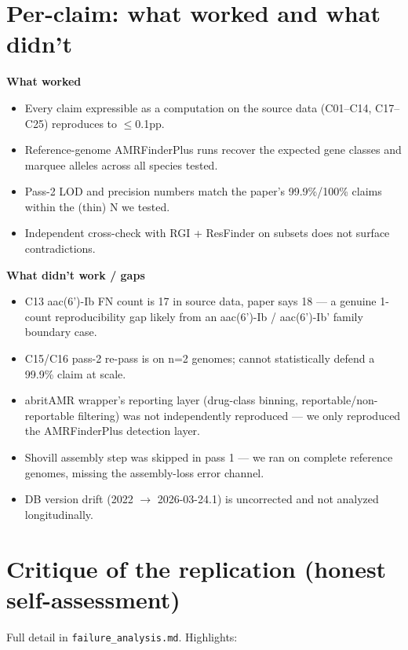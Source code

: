 \documentclass[11pt,a4paper]{article}
\begin{document}
\section{Per-claim: what worked and what didn't}

\textbf{What worked}
\begin{itemize}[leftmargin=1.5em]
  \item Every claim expressible as a computation on the source data (C01--C14, C17--C25) reproduces to $\leq$0.1pp.
  \item Reference-genome AMRFinderPlus runs recover the expected gene classes and marquee alleles across all species tested.
  \item Pass-2 LOD and precision numbers match the paper's 99.9\%/100\% claims within the (thin) N we tested.
  \item Independent cross-check with RGI + ResFinder on subsets does not surface contradictions.
\end{itemize}

\textbf{What didn't work / gaps}
\begin{itemize}[leftmargin=1.5em]
  \item C13 aac(6')-Ib FN count is 17 in source data, paper says 18 --- a genuine 1-count reproducibility gap likely from an aac(6')-Ib / aac(6')-Ib' family boundary case.
  \item C15/C16 pass-2 re-pass is on n=2 genomes; cannot statistically defend a 99.9\% claim at scale.
  \item abritAMR wrapper's reporting layer (drug-class binning, reportable/non-reportable filtering) was not independently reproduced --- we only reproduced the AMRFinderPlus detection layer.
  \item Shovill assembly step was skipped in pass 1 --- we ran on complete reference genomes, missing the assembly-loss error channel.
  \item DB version drift (2022 $\to$ 2026-03-24.1) is uncorrected and not analyzed longitudinally.
\end{itemize}

\section{Critique of the replication (honest self-assessment)}
\label{sec:critique}

Full detail in \texttt{failure\_analysis.md}. Highlights:
\end{document}
